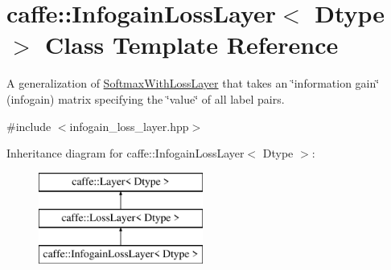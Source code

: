 \hypertarget{classcaffe_1_1InfogainLossLayer}{}\section{caffe\+:\+:Infogain\+Loss\+Layer$<$ Dtype $>$ Class Template Reference}
\label{classcaffe_1_1InfogainLossLayer}


A generalization of \hyperlink{classcaffe_1_1SoftmaxWithLossLayer}{Softmax\+With\+Loss\+Layer} that takes an \char`\"{}information gain\char`\"{} (infogain) matrix specifying the \char`\"{}value\char`\"{} of all label pairs.  




{\ttfamily \#include $<$infogain\+\_\+loss\+\_\+layer.\+hpp$>$}

Inheritance diagram for caffe\+:\+:Infogain\+Loss\+Layer$<$ Dtype $>$\+:\begin{figure}[H]
\begin{center}
\leavevmode
\includegraphics[height=3.000000cm]{classcaffe_1_1InfogainLossLayer}
\end{center}
\end{figure}
